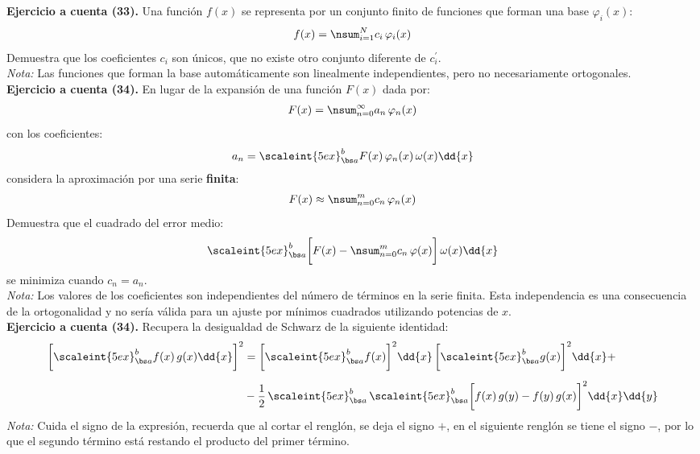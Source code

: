 \noindent
\textbf{Ejercicio a cuenta (33). } Una función $f(x)$ se representa por un conjunto finito de funciones que forman una base $\varphi_{i}(x)$:
\begin{align*}
f(x) = \nsum_{i=1}^{N} c_{i} \, \varphi_{i}(x)
\end{align*}
Demuestra que los coeficientes $c_{i}$ son únicos, que no existe otro conjunto diferente de $c_{i}^{\prime}$.\\
\emph{Nota:} Las funciones que forman la base automáticamente son linealmente independientes, pero no necesariamente ortogonales.
\\[0.5em]
\noindent
\textbf{Ejercicio a cuenta (34). } En lugar de la expansión de una función $F(x)$ dada por:
\begin{align*}
F(x) = \nsum_{n=0}^{\infty} a_{n} \, \varphi_{n} (x)
\end{align*}
con los coeficientes:
\begin{align*}
a_{n} = \scaleint{5ex}_{\bs a}^{b} F(x) \, \varphi_{n} (x) \, \omega (x) \dd{x}
\end{align*}
considera la aproximación por una serie \textbf{finita}:
\begin{align*}
F(x) \approx \nsum_{n=0}^{m} c_{n} \, \varphi_{n} (x)
\end{align*}
Demuestra que el cuadrado del error medio:
\begin{align*}
\scaleint{5ex}_{\bs a}^{b} \bigg[ F(x) - \nsum_{n=0}^{m} c_{n} \, \varphi(x) \bigg] \, \omega (x) \dd{x}
\end{align*}
se minimiza cuando $c_{n} = a_{n}$. \\
\emph{Nota: } Los valores de los coeficientes son independientes del número de términos en la serie finita. Esta independencia es una consecuencia de la ortogonalidad y no sería válida para un ajuste por mínimos cuadrados utilizando potencias de $x$.
\\[0.5em]
\textbf{Ejercicio a cuenta (34). } Recupera la desigualdad de Schwarz de la siguiente identidad:
\begin{align*}
\bigg[ \scaleint{5ex}_{\bs a}^{b} f(x) \, g(x) \dd{x} \bigg
]^{2} &= \bigg[ \scaleint{5ex}_{\bs a}^{b} f(x) \bigg
]^{2} \dd{x} \, \bigg[ \scaleint{5ex}_{\bs a}^{b} g(x) \bigg
]^{2} \dd{x} + \\[0.5em]
&- \dfrac{1}{2} \, \scaleint{5ex}_{\bs a}^{b} \, \scaleint{5ex}_{\bs a}^{b} \bigg[ f(x) \, g(y) - f(y) \, g(x) \bigg
]^{2} \dd{x} \dd{y}
\end{align*}
\emph{Nota:} Cuida el signo de la expresión, recuerda que al cortar el renglón, se deja el signo $+$, en el siguiente renglón se tiene el signo $-$, por lo que el segundo término está restando el producto del primer término.
